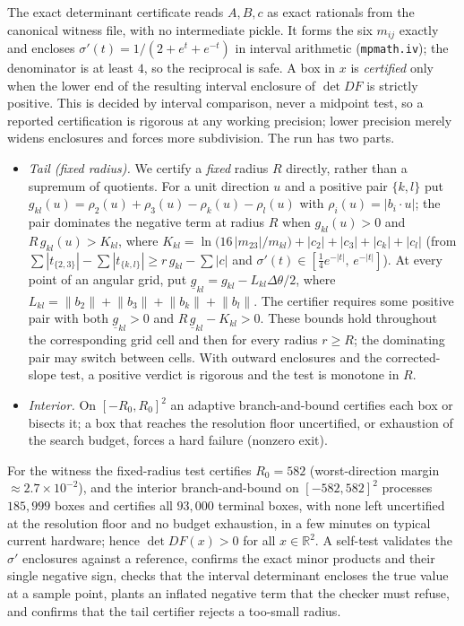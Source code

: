 \documentclass[11pt,twoside,leqno]{article}
\theoremstyle{plain}
\theoremstyle{definition}
\theoremstyle{remark}
\newcommand{\R}{\mathbb{R}}
\newcommand{\norm}[1]{\lVert #1 \rVert}
\begin{document}
The exact determinant certificate reads $A,B,c$ as exact rationals from the
canonical witness file, with no intermediate pickle. It forms
the six $m_{ij}$ exactly and encloses
$\sigma'(t)=1/(2+e^{t}+e^{-t})$ in interval arithmetic
(\texttt{mpmath.iv}); the denominator is at least $4$, so the reciprocal is safe.
A box in $x$ is \emph{certified} only when the lower end of the resulting
interval enclosure of $\det DF$ is strictly positive. This is decided by
interval comparison, never a midpoint test, so a reported certification is
rigorous at any working precision; lower precision merely widens enclosures and
forces more subdivision. The run has two parts.
\begin{itemize}[leftmargin=*]
\item \emph{Tail (fixed radius).} We certify a \emph{fixed} radius $R$ directly, rather than a supremum of quotients. For a unit direction $u$ and a positive pair $\{k,l\}$ put $g_{kl}(u)=\rho_2(u)+\rho_3(u)-\rho_k(u)-\rho_l(u)$ with $\rho_i(u)=|b_i\cdot u|$; the pair dominates the negative term at radius $R$ when $g_{kl}(u)>0$ and $R\,g_{kl}(u)>K_{kl}$, where $K_{kl}=\ln\!\bigl(16\,|m_{23}|/m_{kl}\bigr)+|c_2|+|c_3|+|c_k|+|c_l|$ (from $\sum|t_{\{2,3\}}|-\sum|t_{\{k,l\}}|\ge r\,g_{kl}-\sum|c|$ and $\sigma'(t)\in[\tfrac14 e^{-|t|},\,e^{-|t|}]$). At every point of an angular grid, put $\underline g_{kl}=g_{kl}-L_{kl}\Delta\theta/2$, where $L_{kl}=\norm{b_2}+\norm{b_3}+\norm{b_k}+\norm{b_l}$. The certifier requires some positive pair with both $\underline g_{kl}>0$ and $R\,\underline g_{kl}-K_{kl}>0$. These bounds hold throughout the corresponding grid cell and then for every radius $r\ge R$; the dominating pair may switch between cells. With outward enclosures and the corrected-slope test, a positive verdict is rigorous and the test is monotone in $R$.
\item \emph{Interior.} On $[-R_0,R_0]^2$ an adaptive branch-and-bound certifies each box or bisects it; a box that reaches the resolution floor uncertified, or exhaustion of the search budget, forces a hard failure (nonzero exit).
\end{itemize}
For the witness the fixed-radius test certifies $R_0=582$ (worst-direction margin $\approx 2.7\times10^{-2}$), and the interior branch-and-bound on $[-582,582]^2$ processes $185{,}999$ boxes and certifies all $93{,}000$ terminal boxes, with none left uncertified at the resolution floor and no budget exhaustion, in a few minutes on typical current hardware; hence $\det DF(x)>0$ for all $x\in\R^2$. A self-test validates the $\sigma'$ enclosures against a reference, confirms the exact minor products and their single negative sign, checks that the interval determinant encloses the true value at a sample point, plants an inflated negative term that the checker must refuse, and confirms that the tail certifier rejects a too-small radius.
\end{document}
